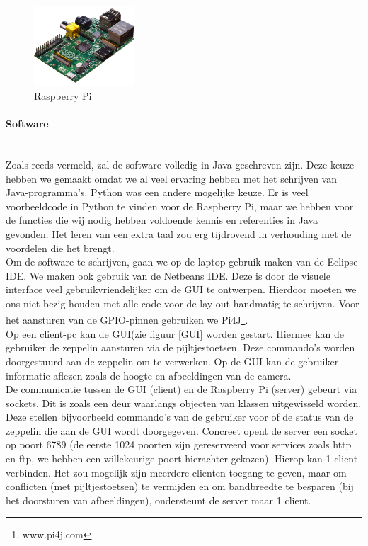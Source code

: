 \documentclass{peno-opdracht2}
\begin{document}
\begin{figure}[ht!]
\centering
\includegraphics[height=30mm]{raspb.jpg}
\caption{Raspberry Pi}
\label{Pi}
\end{figure}

\paragraph{Software} ~\\
Zoals reeds vermeld, zal de software volledig in Java geschreven zijn. Deze keuze hebben we gemaakt omdat we al veel ervaring hebben met het schrijven van Java-programma's. Python was een andere mogelijke keuze. Er is veel voorbeeldcode in Python te vinden voor de Raspberry Pi, maar we hebben voor de functies die wij nodig hebben voldoende kennis en referenties in Java gevonden. Het leren van een extra taal zou erg tijdrovend in verhouding met de voordelen die het brengt. \\

Om de software te schrijven, gaan we op de laptop gebruik maken van de Eclipse IDE. We maken ook gebruik van de Netbeans IDE. Deze is door de visuele interface veel gebruikvriendelijker om de GUI te ontwerpen. Hierdoor moeten we ons niet bezig houden met alle code voor de lay-out handmatig te schrijven. Voor het aansturen van de GPIO-pinnen gebruiken we Pi4J\footnote{www.pi4j.com}.\\

Op een client-pc kan de GUI(zie figuur \ref{GUI} worden gestart. Hiermee kan de gebruiker de zeppelin aansturen via de pijltjestoetsen. Deze commando's worden doorgestuurd aan de zeppelin om te verwerken. Op de GUI kan de gebruiker informatie aflezen zoals de hoogte en afbeeldingen van de camera. \\

De communicatie tussen de GUI (client) en de Raspberry Pi (server) gebeurt via sockets. Dit is zoals een deur waarlangs objecten van klassen uitgewisseld worden. Deze stellen bijvoorbeeld commando's van de gebruiker voor of de status van de zeppelin die aan de GUI wordt doorgegeven. Concreet opent de server een socket op poort 6789 (de eerste 1024 poorten zijn gereserveerd voor services zoals http en ftp, we hebben een willekeurige poort hierachter gekozen). Hierop kan 1 client verbinden. Het zou mogelijk zijn meerdere clienten toegang te geven, maar om conflicten (met pijltjestoetsen) te vermijden en om bandbreedte te besparen (bij het doorsturen van afbeeldingen), ondersteunt de server maar 1 client.  \\
\end{document}
